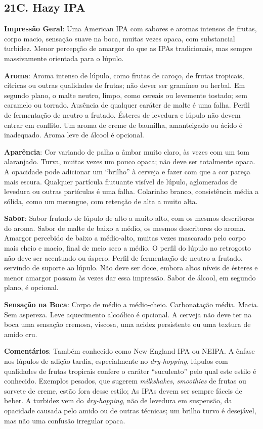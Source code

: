 \subsection*{21C. Hazy IPA}
\textbf{Impressão Geral}: Uma American IPA com sabores e aromas intensos de frutas, corpo macio, sensação suave na boca, muitas vezes opaca, com substancial turbidez. Menor percepção de amargor do que as IPAs tradicionais, mas sempre massivamente orientada para o lúpulo.

\textbf{Aroma}: Aroma intenso de lúpulo, como frutas de caroço, de frutas tropicais, cítricas ou outras qualidades de frutas; não dever ser gramíneo ou herbal. Em segundo plano, o malte neutro, limpo, como cereais ou levemente tostado; sem caramelo ou torrado. Ausência de qualquer caráter de malte é uma falha. Perfil de fermentação de neutro a frutado. Ésteres de levedura e lúpulo não devem entrar em conflito. Um aroma de creme de baunilha, amanteigado ou ácido é inadequado. Aroma leve de álcool é opcional.

\textbf{Aparência}: Cor variando de palha a âmbar muito claro, às vezes com um tom alaranjado. Turva, muitas vezes um pouco opaca; não deve ser totalmente opaca. A opacidade pode adicionar um “brilho” à cerveja e fazer com que a cor pareça mais escura. Qualquer partícula flutuante visível de lúpulo, aglomerados de levedura ou outras partículas é uma falha. Colarinho branco, consistência média a sólida, como um merengue, com retenção de alta a muito alta.

\textbf{Sabor}: Sabor frutado de lúpulo de alto a muito alto, com os mesmos descritores do aroma. Sabor de malte de baixo a médio, os mesmos descritores do aroma. Amargor percebido de baixo a médio-alto, muitas vezes mascarado pelo corpo mais cheio e macio, final de meio seco a médio. O perfil do lúpulo no retrogosto não deve ser acentuado ou áspero. Perfil de fermentação de neutro a frutado, servindo de suporte ao lúpulo. Não deve ser doce, embora altos níveis de ésteres e menor amargor possam às vezes dar essa impressão. Sabor de álcool, em segundo plano, é opcional.

\textbf{Sensação na Boca}: Corpo de médio a médio-cheio. Carbonatação média. Macia. Sem aspereza. Leve aquecimento alcoólico é opcional. A cerveja não deve ter na boca uma sensação cremosa, viscosa, uma acidez persistente ou uma textura de amido cru.

\textbf{Comentários}: Também conhecido como New England IPA ou NEIPA. A ênfase nos lúpulos de adição tardia, especialmente no \textit{dry-hopping}, lúpulos com qualidades de frutas tropicais confere o caráter “suculento” pelo qual este estilo é conhecido. Exemplos pesados, que sugerem \textit{milkshakes}, \textit{smoothies} de frutas ou sorvete de creme, estão fora desse estilo; As IPAs devem ser sempre fáceis de beber. A turbidez vem do \textit{dry-hopping}, não de levedura em suspensão, da opacidade causada pelo amido ou de outras técnicas; um brilho turvo é desejável, mas não uma confusão irregular opaca.

